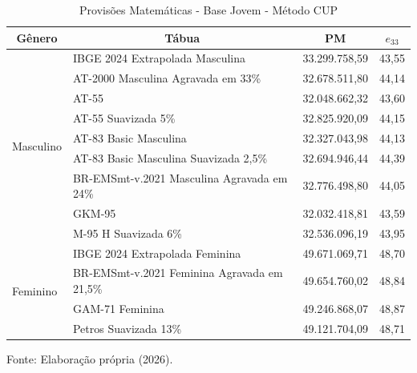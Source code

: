 \begin{table}[htbp]
    \centering
    \caption{Provisões Matemáticas - Base Jovem - Método CUP}
    \begin{threeparttable}
    \renewcommand{\arraystretch}{1.0}
    \begin{tabular}{llrr}
    \toprule
    \multicolumn{1}{c}{\textbf{Gênero}} & \multicolumn{1}{c}{\textbf{Tábua}} & \multicolumn{1}{c}{\textbf{PM}} & \multicolumn{1}{c}{\textbf{$e_{33}$}} \\ \midrule
    \multirow{9}{*}{Masculino} & IBGE 2024 Extrapolada Masculina & 33.299.758,59	& 43,55 \\
                    & AT-2000 Masculina Agravada em 33\% & 32.678.511,80 & 44,14 \\
                    & AT-55 & 32.048.662,32	& 43,60 \\
                    & AT-55 Suavizada 5\% & 32.825.920,09 & 44,15 \\
                    & AT-83 Basic Masculina & 32.327.043,98 & 44,13 \\
                    & AT-83 Basic Masculina Suavizada 2,5\% & 32.694.946,44 & 44,39 \\
                    & BR-EMSmt-v.2021 Masculina Agravada em 24\% & 32.776.498,80 & 44,05 \\
                    & GKM-95 & 32.032.418,81 & 43,59 \\
                    & M-95 H Suavizada 6\% & 32.536.096,19 & 43,95 \\ \hline
    \multirow{4}{*}{Feminino} & IBGE 2024 Extrapolada Feminina & 49.671.069,71 & 48,70 \\
                                & BR-EMSmt-v.2021 Feminina Agravada em 21,5\% & 49.654.760,02 & 48,84 \\
                                & GAM-71 Feminina & 49.246.868,07 & 48,87 \\ 
                        & Petros Suavizada 13\% & 49.121.704,09 & 48,71 \\ \bottomrule
    \end{tabular}
    \begin{tablenotes}[flushleft]
        \small
        \item Fonte: Elaboração própria (2026).
    \end{tablenotes}
    \end{threeparttable}
    \label{tab:jovem-CUP}
\end{table}

